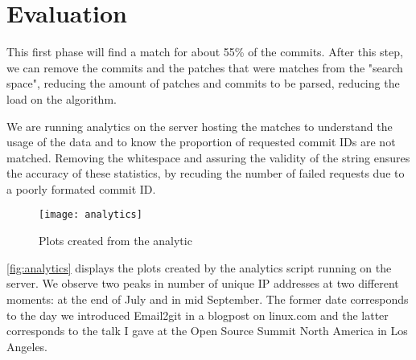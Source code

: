 \section{Evaluation}



This first phase will find a match for about 55\% of the commits. After this step, we can remove the commits and the patches that were matches from the "search space", reducing the amount of patches and commits to be parsed, reducing the load on the algorithm. 






We are running analytics on the server hosting the matches to understand the usage of the data and to know the proportion of requested commit IDs are not matched. Removing the whitespace and assuring the validity of the string ensures the accuracy of these statistics, by recuding the number of failed requests due to a poorly formated commit ID.

 \begin{figure}[htb]
\centering
\texttt{[image: analytics]}
\caption{Plots created from the analytic}
\label{fig:analytics}
\end{figure}

\autoref{fig:analytics} displays the plots created by the analytics script running on the server. We observe two peaks in number of unique IP addresses at two different moments: at the end of July and in mid September. The former date corresponds to the day we introduced Email2git in a blogpost on linux.com and the latter corresponds to the talk I gave at the Open Source Summit North America in Los Angeles. 


